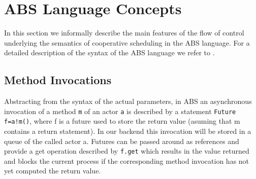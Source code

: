 

\section{ABS Language Concepts}
\label{lang}
In this section we informally describe the main features of the flow of control
underlying the semantics of cooperative scheduling in the ABS language.
For a detailed description of the syntax of the ABS language we refer to \cite{abs}.

\subsection{Method Invocations}\label{amc}
Abstracting from the syntax of the actual parameters,
in ABS an asynchronous invocation of a method \lstinline|m| of an actor \lstinline|a| is described by a statement
\lstinline|Future f=a!m()|, where f is a future used to store the return value
(asuming that m contains a return statement).
In our backend this invocation will be stored in a queue of the called actor a.
Futures can be passed around as references and provide a get operation
described by \lstinline|f.get| which results in the value returned and blocks
the current process if the corresponding method invocation has not yet computed
the return value.

